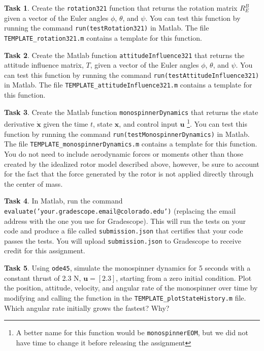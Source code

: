 \documentclass{article}
\theoremstyle{definition}
\newtheorem{task}{Task}
\begin{document}
\begin{task}
    Create the \texttt{rotation321} function that returns the rotation matrix $R^B_E$ given a vector of the Euler angles $\phi$, $\theta$, and $\psi$. You can test this function by running the command \texttt{run(testRotation321)} in Matlab. The file \texttt{TEMPLATE\_rotation321.m} contains a template for this function.
\end{task}

\begin{task}
    Create the Matlab function \texttt{attitudeInfluence321} that returns the attitude influence matrix, $T$, given a vector of the Euler angles $\phi$, $\theta$, and $\psi$. You can test this function by running the command \texttt{run(testAttitudeInfluence321)} in Matlab. The file \texttt{TEMPLATE\_attitudeInfluence321.m} contains a template for this function.
\end{task}

\begin{task}
    Create the Matlab function \texttt{monospinnerDynamics} that returns the state derivative $\dot{\textbf{x}}$ given the time $t$, state $\textbf{x}$, and control input $\textbf{u}$ \footnote{A better name for this function would be \texttt{monospinnerEOM}, but we did not have time to change it before releasing the assignment}. You can test this function by running the command \texttt{run(testMonospinnerDynamics)} in Matlab. The file \texttt{TEMPLATE\_monospinnerDynamics.m} contains a template for this function. You do not need to include aerodynamic forces or moments other than those created by the idealized rotor model described above, however, be sure to account for the fact that the force generated by the rotor is not applied directly through the center of mass.
\end{task}

\begin{task}
    In Matlab, run the command \texttt{evaluate('your.gradescope.email@colorado.edu')} (replacing the email address with the one you use for Gradescope). This will run the tests on your code and produce a file called \texttt{submission.json} that certifies that your code passes the tests. You will upload \texttt{submission.json} to Gradescope to receive credit for this assignment.
\end{task}

\begin{task}\label{task:powered}
    Using \texttt{ode45}, simulate the monospinner dynamics for 5 seconds with a constant thrust of 2.3 N, $\textbf{u}=[2.3]$, starting from a zero initial condition. Plot the position, attitude, velocity, and angular rate of the monospinner over time by modifying and calling the function in the \texttt{TEMPLATE\_plotStateHistory.m} file. Which angular rate initially grows the fastest? Why?
\end{task}
\end{document}
